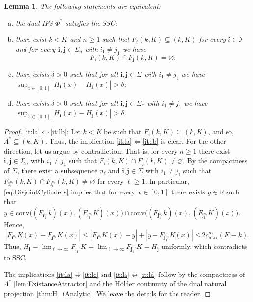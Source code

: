 \documentclass[11pt,]{article}
\def\cref#1{\ref{#1}}%
\newtheorem{lemma}[theorem]{Lemma}
\theoremstyle{definition}
\theoremstyle{remark}
\newcommand{\0}{\mathbf{0}}
\newcommand{\bi}{\mathbf{i}}
\newcommand{\bj}{\mathbf{j}}
\begin{document}
\begin{lemma}\label{lem:SSCEequiv}
The following statements are equivalent: 
\begin{enumerate}[a)]
\item\label{it:la} the dual IFS $\Phi^*$ satisfies the SSC;
\item\label{it:lb} there exist $k<K$ and $n\geq1$ such that $F_{i}(k,K)\subseteq(k,K)$ for every
  $i\in\mathcal{I}$ and for every $\bi,\bj\in\Sigma_n$ with $i_1\neq j_1$ we have
\begin{equation*}
	F_{\bi}(k,K)\cap F_{\bj}(k,K)=\varnothing; 
\end{equation*}
\item\label{it:lc} there exists $\delta>0$ such that for all $\bi,\bj \in\Sigma$ with $i_1\neq j_1$ we have
  $\sup_{x\in[0,1]} |H_{\bi}(x) - H_{\bj}(x)| > \delta$;
\item\label{it:ld} there exists $\delta>0$ such that for all $\bi,\bj \in\Sigma_*$ with $i_1\neq j_1$ we have
  $\sup_{x\in[0,1]} |H_{\bi}(x) - H_{\bj}(x)| > \delta$.
\end{enumerate}
\end{lemma}


\begin{proof}
  \cref{it:la}$\Leftrightarrow$\cref{it:lb}: Let $k<K$ be such that
  $F_{i}\overline{(k,K)}\subseteq(k,K)$, and so, $\Lambda^*\subseteq(k,K)$. Thus, the
  implication \cref{it:la}$\Leftarrow$\cref{it:lb} is clear. For the other direction, let us
  argue by contradiction. That is, for every $n\geq1$ there exist $\bi,\bj\in\Sigma_n$ with
  $i_1\neq j_1$ such that $F_{\bi}(k,K)\cap F_{\bj}(k,K)\neq\varnothing$. By the compactness
  of $\Sigma$, there exist a subsequence $n_\ell$ and $\bi,\bj\in\Sigma$ with $i_1\neq j_1$
  such that $F_{\bi_1^{n_\ell}}(k,K)\cap F_{\bj_1^{n_\ell}}(k,K)\neq\varnothing$ for every
  $\ell\geq1$. In particular, \cref{eq:DisjointCylinders} implies that for every $x\in[0,1]$
  there exists $y\in\mathbb{R}$ such that $y\in\mathrm{conv}\big((F_{\bi_1^{n_\ell}}k)(x),
    (F_{\bi_1^{n_\ell}}K)(x)\big) \cap \mathrm{conv}\big((F_{\bj_1^{n_\ell}}k)(x),
  (F_{\bj_1^{n_\ell}}K)(x)\big)$. Hence,
  $$
  |F_{\bi_1^{n_\ell}}K(x)-F_{\bj_1^{n_\ell}}K(x)|\leq
  |F_{\bi_1^{n_\ell}}K(x)-y|+|y-F_{\bj_1^{n_\ell}}K(x)|\leq 2c_{\max}^{n_\ell}(K-k).
  $$
  Thus,
  $H_{\bi}=\lim_{\ell\to\infty}F_{\bi_1^{n_\ell}}K=\lim_{\ell\to\infty}F_{\bj_1^{n_\ell}}K=H_{\bj}$
  uniformly, which contradicts to SSC.

  The implications \cref{it:la}$\Leftrightarrow$\cref{it:lc} and
  \cref{it:la}$\Leftrightarrow$\cref{it:ld} follow by the compactness of $\Lambda^*$
  \cref{lem:ExistanceAttractor} and the H\"older continuity of the dual natural projection
  \cref{thm:H_iAnalytic}. We leave the details for the reader.
\end{proof}
\end{document}
